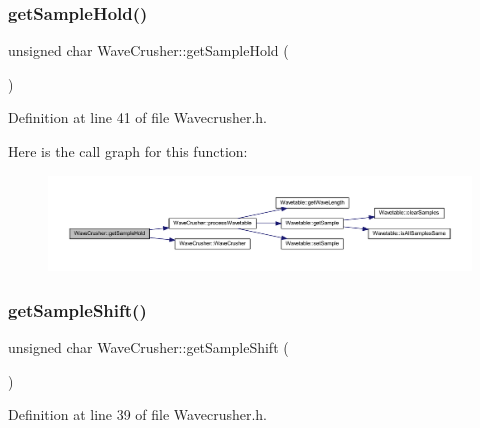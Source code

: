 \subsubsection{\texorpdfstring{get\+Sample\+Hold()}{getSampleHold()}}
{\footnotesize\ttfamily unsigned char Wave\+Crusher\+::get\+Sample\+Hold (\begin{DoxyParamCaption}{ }\end{DoxyParamCaption})\hspace{0.3cm}{\ttfamily [inline]}}



Definition at line 41 of file Wavecrusher.\+h.

Here is the call graph for this function\+:
\nopagebreak
\begin{figure}[H]
\begin{center}
\leavevmode
\includegraphics[width=350pt]{class_wave_crusher_a084b8413b14c16e4cab7f65caf9e3fd0_cgraph}
\end{center}
\end{figure}
\mbox{\label{class_wave_crusher_a08b705c5bb1c1c4a22d8265f2992a0bd}} 
\subsubsection{\texorpdfstring{get\+Sample\+Shift()}{getSampleShift()}}
{\footnotesize\ttfamily unsigned char Wave\+Crusher\+::get\+Sample\+Shift (\begin{DoxyParamCaption}{ }\end{DoxyParamCaption})\hspace{0.3cm}{\ttfamily [inline]}}



Definition at line 39 of file Wavecrusher.\+h.

\mbox{\label{class_wave_crusher_a2bb40dc158e5e3358b632572ba2eb7c3}} 
